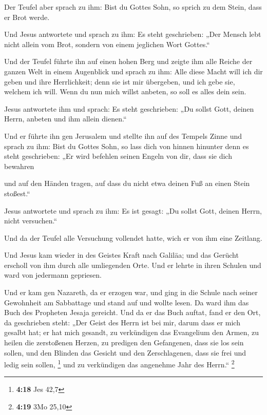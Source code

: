 Der Teufel aber sprach zu ihm: Bist du Gottes Sohn, so
sprich zu dem Stein, dass er Brot werde.

 Und Jesus antwortete und sprach zu ihm: Es steht
geschrieben: „Der Mensch lebt nicht allein vom Brot, sondern von einem
jeglichen Wort Gottes.``

 Und der Teufel führte ihn auf einen hohen Berg und zeigte
ihm alle Reiche der ganzen Welt in einem Augenblick  und
sprach zu ihm: Alle diese Macht will ich dir geben und ihre
Herrlichkeit; denn sie ist mir übergeben, und ich gebe sie, welchem ich
will.  Wenn du nun mich willst anbeten, so soll es alles
dein sein.

 Jesus antwortete ihm und sprach: Es steht geschrieben:
„Du sollst Gott, deinen Herrn, anbeten und ihm allein dienen.``

 Und er führte ihn gen Jerusalem und stellte ihn auf des
Tempels Zinne und sprach zu ihm: Bist du Gottes Sohn, so lass dich von
hinnen hinunter  denn es steht geschrieben: „Er wird
befehlen seinen Engeln von dir, dass sie dich bewahren

 und auf den Händen tragen, auf dass du nicht etwa deinen
Fuß an einen Stein stoßest.``

 Jesus antwortete und sprach zu ihm: Es ist gesagt: „Du
sollst Gott, deinen Herrn, nicht versuchen.``

 Und da der Teufel alle Versuchung vollendet hatte, wich
er von ihm eine Zeitlang.

 Und Jesus kam wieder in des Geistes Kraft nach Galiläa;
und das Gerücht erscholl von ihm durch alle umliegenden Orte.
 Und er lehrte in ihren Schulen und ward von jedermann
gepriesen.

 Und er kam gen Nazareth, da er erzogen war, und ging in
die Schule nach seiner Gewohnheit am Sabbattage und stand auf und wollte
lesen.  Da ward ihm das Buch des Propheten Jesaja
gereicht. Und da er das Buch auftat, fand er den Ort, da geschrieben
steht:  „Der Geist des Herrn ist bei mir, darum dass er
mich gesalbt hat; er hat mich gesandt, zu verkündigen das Evangelium den
Armen, zu heilen die zerstoßenen Herzen, zu predigen den Gefangenen,
dass sie los sein sollen, und den Blinden das Gesicht und den
Zerschlagenen, dass sie frei und ledig sein sollen, \footnote{\textbf{4:18}
  Jes 42,7}  und zu verkündigen das angenehme Jahr des
Herrn.`` \footnote{\textbf{4:19} 3Mo 25,10}

